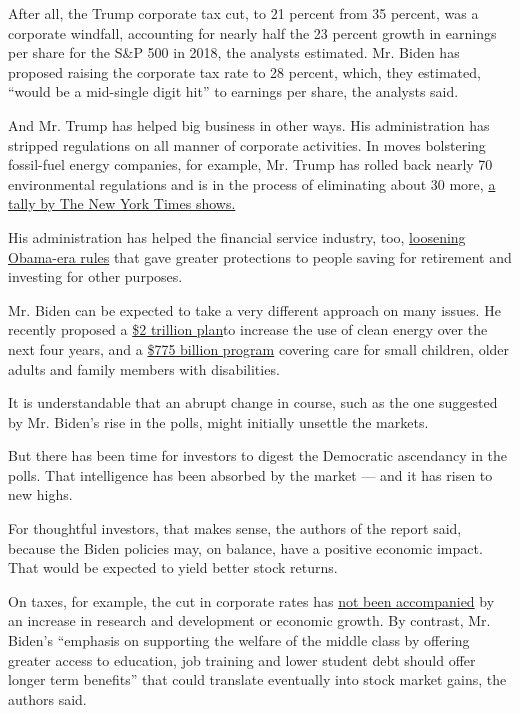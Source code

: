 After all, the Trump corporate tax cut, to 21 percent from 35 percent,
was a corporate windfall, accounting for nearly half the 23 percent
growth in earnings per share for the S\&P 500 in 2018, the analysts
estimated. Mr. Biden has proposed raising the corporate tax rate to 28
percent, which, they estimated, ``would be a mid-single digit hit'' to
earnings per share, the analysts said.

And Mr. Trump has helped big business in other ways. His administration
has stripped regulations on all manner of corporate activities. In moves
bolstering fossil-fuel energy companies, for example, Mr. Trump has
rolled back nearly 70 environmental regulations and is in the process of
eliminating about 30 more,
\href{https://www.nytimes3xbfgragh.onion/interactive/2020/climate/trump-environment-rollbacks.html}{a
tally by The New York Times shows.}

His administration has helped the financial service industry, too,
\href{https://www.nytimes3xbfgragh.onion/2020/07/16/your-money/fiduciary-duty-investments-best-interest.html}{loosening
Obama-era rules} that gave greater protections to people saving for
retirement and investing for other purposes.

Mr. Biden can be expected to take a very different approach on many
issues. He recently proposed a
\href{https://www.nytimes3xbfgragh.onion/2020/07/14/us/politics/biden-climate-plan.html}{\$2
trillion plan}to increase the use of clean energy over the next four
years, and a
\href{https://www.nytimes3xbfgragh.onion/2020/07/21/us/politics/biden-workplace-childcare.html}{\$775
billion program} covering care for small children, older adults and
family members with disabilities.

It is understandable that an abrupt change in course, such as the one
suggested by Mr. Biden's rise in the polls, might initially unsettle the
markets.

But there has been time for investors to digest the Democratic
ascendancy in the polls. That intelligence has been absorbed by the
market --- and it has risen to new highs.

For thoughtful investors, that makes sense, the authors of the report
said, because the Biden policies may, on balance, have a positive
economic impact. That would be expected to yield better stock returns.

On taxes, for example, the cut in corporate rates has
\href{https://www.nytimes3xbfgragh.onion/2018/11/12/business/economy/trumps-tax-cut-was-supposed-to-change-corporate-behavior-heres-what-happened.html}{not
been accompanied} by an increase in research and development or economic
growth. By contrast, Mr. Biden's ``emphasis on supporting the welfare of
the middle class by offering greater access to education, job training
and lower student debt should offer longer term benefits'' that could
translate eventually into stock market gains, the authors said.

